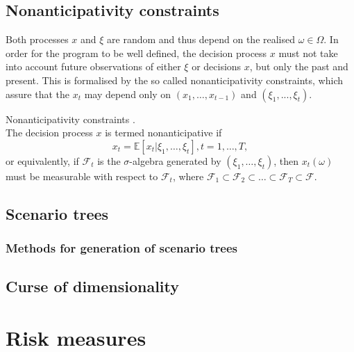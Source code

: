 \subsection{Nonanticipativity constraints}
Both processes $x$ and $\xi$ are random and thus depend on the realised $\omega \in \Omega$. In order for the program to be well defined, the decision process $x$ must not take into account future observations of either 
$\xi$ or decisions $x$, but only the past and present. This is formalised by the so called nonanticipativity constraints, which assure that the $x_t$ may depend only on $(x_1,\dots,x_{t-1})$ and $(\xi_1,...,\xi_{t})$.

\begin{defn}{Nonanticipativity constraints} \cite[Section 3.3.]{stochasticprogrammingbible}. \\
\label{def:nonanticipativity constraints}
The decision process $x$ is termed nonanticipative if
\begin{equation*}
x_t=\mathbb{E}\left[x_t|\xi_1,\dots,\xi_t \right], t=1,\dots,T,
\end{equation*}
or equivalently, if $\mathcal{F}_t$ is the $\sigma$-algebra generated by $(\xi_1,\dots,\xi_t)$, then $x_t(\omega)$ must be measurable with respect to $\mathcal{F}_t$, where $\mathcal{F}_1 \subset \mathcal{F}_2 \subset \dots \subset \mathcal{F}_T \subset \mathcal{F}$.
\end{defn}

\subsection{Scenario trees}
\subsubsection{Methods for generation of scenario trees}
\subsection{Curse of dimensionality}
\section{Risk measures}
